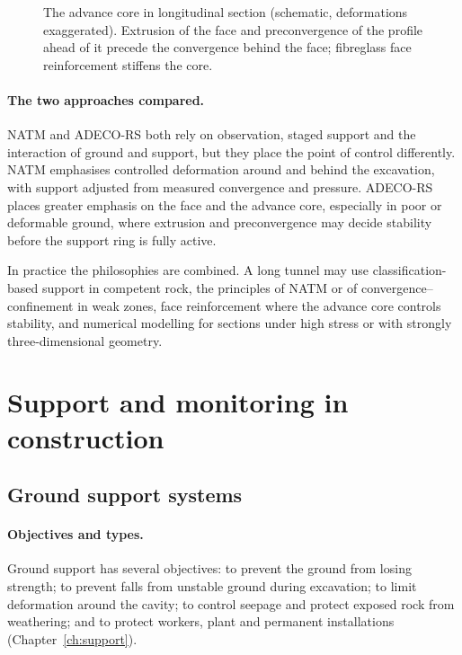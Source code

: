 \begin{figure}[htbp]
\centering
{}
\caption{The advance core in longitudinal section (schematic, deformations exaggerated). Extrusion of the face and preconvergence of the profile ahead of it precede the convergence behind the face; fibreglass face reinforcement stiffens the core.}
\label{fig:advance-core}
\end{figure}

\paragraph{The two approaches compared.}
\label{sec:natm-vs-adeco}
NATM and ADECO-RS both rely on observation, staged support and the
interaction of ground and support, but they place the point of control
differently. NATM emphasises controlled deformation around and behind the
excavation, with support adjusted from measured convergence and pressure.
ADECO-RS places greater emphasis on the face and the advance core, especially
in poor or deformable ground, where extrusion and preconvergence may decide
stability before the support ring is fully active.

In practice the philosophies are combined. A long tunnel may use
classification-based support in competent rock, the principles of NATM or of
convergence--confinement in weak zones, face reinforcement where the advance
core controls stability, and numerical modelling for sections under high
stress or with strongly three-dimensional geometry.

\section{Support and monitoring in construction}
\label{sec:support-and-monitoring-in-construction}

\subsection{Ground support systems}
\label{sec:ground-support-systems}

\paragraph{Objectives and types.}
\label{sec:support-systems}
Ground support has several objectives: to prevent the ground from losing
strength; to prevent falls from unstable ground during excavation; to limit
deformation around the cavity; to control seepage and protect exposed rock
from weathering; and to protect workers, plant and permanent installations
(Chapter~\ref{ch:support}).

